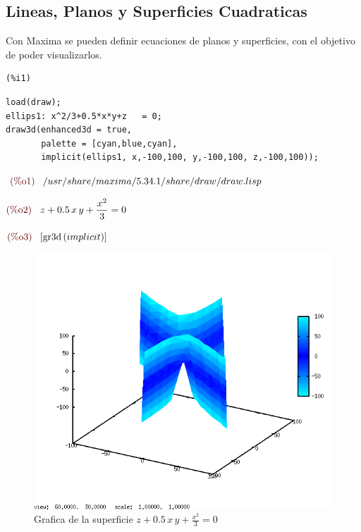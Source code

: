 \documentclass[12pt]{article}
\begin{document}
\subsection{Lineas, Planos y Superficies Cuadraticas}
Con Maxima se pueden definir ecuaciones de planos y superficies, con el objetivo de poder visualizarlos.

\begin{minipage}[t]{8ex}{\color{red}\bf
\begin{verbatim}
(%i1) 
\end{verbatim}}
\end{minipage}
\begin{minipage}[t]{\textwidth}{\color{blue}
\begin{verbatim}
load(draw);
ellips1: x^2/3+0.5*x*y+z   = 0;
draw3d(enhanced3d = true,
       palette = [cyan,blue,cyan],
       implicit(ellips1, x,-100,100, y,-100,100, z,-100,100));
\end{verbatim}}
\end{minipage}

\begin{math}\displaystyle
\parbox{8ex}{\color{labelcolor}(\%o1) }
/usr/share/maxima/5.34.1/share/draw/draw.lisp
\end{math}

\begin{math}\displaystyle
\parbox{8ex}{\color{labelcolor}(\%o2) }
z+0.5\,x\,y+\frac{{x}^{2}}{3}=0
\end{math}

\begin{math}\displaystyle
\parbox{8ex}{\color{labelcolor}(\%o3) }
[\mathrm{gr3d}\left( implicit\right) ]
\end{math}
\begin{figure}[H]
\centering
\includegraphics[scale=0.5]{1.png}
\caption{Grafica de la superficie $z+0.5\,x\,y+\frac{{x}^{2}}{3}=0$}
\end{figure}
\end{document}
